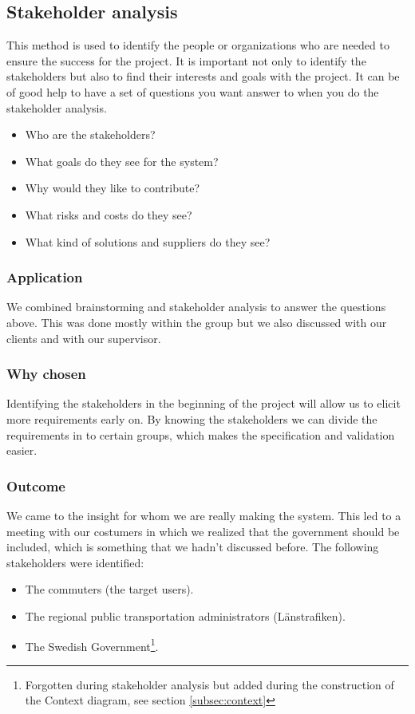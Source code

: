 \documentclass[a4paper]{article}
\begin{document}
    \subsection{Stakeholder analysis}
 This method is used to identify the people or organizations who are needed
to ensure the success for the project. It is important not only to identify the
stakeholders but also to find their interests and goals with the project. It can
be of good help to have a set of questions you want answer to when you do the
stakeholder analysis.

    \begin{itemize}
      \item Who are the stakeholders?
      \item What goals do they see for the system?
      \item Why would they like to contribute?
      \item What risks and costs do they see?
      \item What kind of solutions and suppliers do they see?
    \end{itemize}
    
    \subsubsection{Application}
 We combined brainstorming and stakeholder analysis to answer the questions
above. This was done mostly within the group but we also discussed with our
clients and with our supervisor.
    \subsubsection{Why chosen}
    Identifying the stakeholders in the beginning of the project will allow us to elicit
more requirements early on. By knowing the stakeholders we can divide the
requirements in to certain groups, which makes the specification and validation
easier.
    \subsubsection{Outcome}
We came to the insight for whom we are really making the system. This led to
a meeting with our costumers in which we realized that the government should
be included, which is something that we hadn’t discussed before.
	The following stakeholders were identified:

    \begin{itemize}
      \item The commuters (the target users). 
      \item The regional public transportation administrators (Länstrafiken). 
      \item The Swedish Government\footnote{Forgotten during stakeholder analysis but added during the construction of the Context diagram, see section \ref{subsec:context}}.
    \end{itemize}
    
\end{document}
